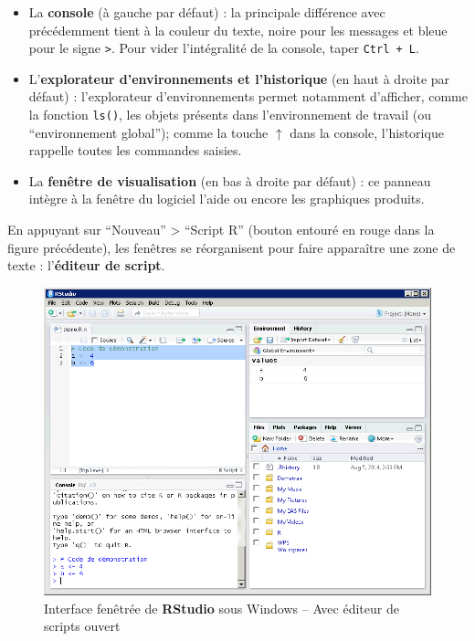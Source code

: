 \documentclass[12pt,twosided, notitlepage]{book}
\providecommand{\tightlist}{%
  \setlength{\itemsep}{0pt}\setlength{\parskip}{0pt}}
\begin{document}
\begin{itemize}
\tightlist
\item
  La \textbf{console} (à gauche par défaut) : la principale différence
  avec précédemment tient à la couleur du texte, noire pour les messages
  et bleue pour le signe \texttt{\textgreater{}}. Pour vider
  l'intégralité de la console, taper \texttt{Ctrl\ +\ L}.
\item
  L'\textbf{explorateur d'environnements et l'historique} (en haut à
  droite par défaut) : l'explorateur d'environnements permet notamment
  d'afficher, comme la fonction \texttt{ls()}, les objets présents dans
  l'environnement de travail (ou \enquote{environnement global}); comme
  la touche \(\uparrow\) dans la console, l'historique rappelle toutes
  les commandes saisies.
\item
  La \textbf{fenêtre de visualisation} (en bas à droite par défaut) : ce
  panneau intègre à la fenêtre du logiciel l'aide ou encore les
  graphiques produits.
\end{itemize}

En appuyant sur \enquote{Nouveau} \textgreater{} \enquote{Script R}
(bouton entouré en rouge dans la figure précédente), les fenêtres se
réorganisent pour faire apparaître une zone de texte : l'\textbf{éditeur
de script}.

\begin{figure}
\centering
\includegraphics{../figures/Interface_RStudio_2.png}
\caption{Interface fenêtrée de \textbf{RStudio} sous Windows -- Avec
éditeur de scripts ouvert}
\end{figure}
\end{document}
